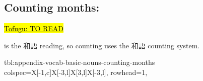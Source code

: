 \documentclass[../nihongo-gakushuu-kyouzai-supplementary.tex]{subfiles}
\begin{document}
\subsection{Counting months: }
\href{https://www.tofugu.com/japanese/japanese-counter-tsuki-gatsu-getsu/}{\hl{Tofugu: TO READ}}

 is the 和語 reading, so counting uses the 和語 counting system.

{tbl:appendix-vocab-basic-nouns-counting-months}  %
{
    colspec={X[-1,c]X[-3,l]X[3,l]X[-3,l]},
    rowhead=1,
}  %
\end{document}
